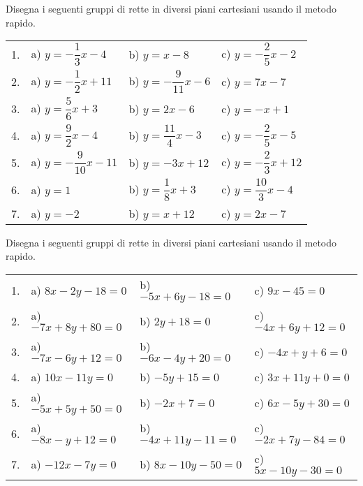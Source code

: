 \subsubsection*{}

\begin{esercizio}\label{ese:}
Disegna i seguenti gruppi di rette in diversi 
piani cartesiani usando il metodo rapido.

\begin{tabular}{llll}
1. &
a) \quad $y = -\dfrac{1}{3} x -4$ & 
b) \quad $y = x -8$ & 
c) \quad $y = -\dfrac{2}{5} x -2$ \\
2. &
a) \quad $y = -\dfrac{1}{2} x +11$ &   
b) \quad $y = -\dfrac{9}{11} x -6$ &
c) \quad $y = 7 x -7$ \\
3. &
a) \quad $y = \dfrac{5}{6} x +3$ &   
b) \quad $y = 2 x -6$ &
c) \quad $y = - x +1$ \\
4. &
a) \quad $y = \dfrac{9}{2} x -4$ &   
b) \quad $y = \dfrac{11}{4} x -3$ &
c) \quad $y = -\dfrac{2}{5} x -5$ \\
5. &
a) \quad $y = -\dfrac{9}{10} x -11$ &   
b) \quad $y = -3 x +12$ &
c) \quad $y = -\dfrac{2}{3} x +12$ \\
6. &
a) \quad $y = 1$ &   
b) \quad $y = \dfrac{1}{8} x +3$ &
c) \quad $y = \dfrac{10}{3} x -4$ \\
7. &
a) \quad $y = -2$ &   
b) \quad $y = x +12$ &
c) \quad $y = 2x -7$ \\
\end{tabular}
\end{esercizio}

\begin{esercizio}\label{ese:}
Disegna i seguenti gruppi di rette in diversi 
piani cartesiani usando il metodo rapido.

\begin{tabular}{llll}
1. &
a) \quad $8 x - 2 y - 18 = 0$ & 
b) \quad $-5 x + 6 y - 18 = 0$ & 
c) \quad $9 x - 45 = 0$ \\
2. &
a) \quad $-7 x + 8 y + 80 = 0$ &   
b) \quad $2 y + 18 = 0$ &
c) \quad $-4 x + 6 y + 12 = 0$ \\
3. &
a) \quad $-7 x - 6 y + 12 = 0$ &   
b) \quad $-6 x - 4 y + 20 = 0$ &
c) \quad $-4 x + y + 6 = 0$ \\
4. &
a) \quad $10 x - 11 y = 0$ &   
b) \quad $- 5 y + 15 = 0$ &
c) \quad $3 x + 11 y + 0 = 0$ \\
5. &
a) \quad $-5 x + 5 y + 50 = 0$ &   
b) \quad $-2 x + 7 = 0$ &
c) \quad $6 x - 5 y + 30 = 0$ \\
6. &
a) \quad $-8 x - y + 12 = 0$ &   
b) \quad $-4 x + 11 y - 11 = 0$ &
c) \quad $-2 x + 7 y - 84 = 0$ \\
7. &
a) \quad $-12 x - 7 y = 0$ &   
b) \quad $8 x - 10 y - 50 = 0$ &
c) \quad $5 x - 10 y - 30 = 0$ \\
\end{tabular}
\end{esercizio}


